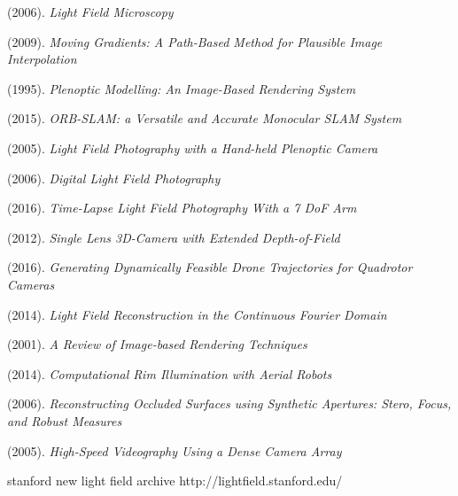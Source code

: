 \documentclass[12pt]{report}
\begin{document}
\begin{thebibliography}{10}
	(2006). \emph{Light Field Microscopy}
	
	(2009). \emph{Moving Gradients: A Path-Based Method for Plausible Image Interpolation}	
	
	(1995). \emph{Plenoptic Modelling: An Image-Based Rendering System}

	(2015). \emph{ORB-SLAM: a Versatile and Accurate Monocular SLAM System}

	(2005). \emph{Light Field Photography with a Hand-held Plenoptic Camera}

	(2006). \emph{Digital Light Field Photography}	

	(2016). \emph{Time-Lapse Light Field Photography With a 7 DoF Arm}

	(2012). \emph{Single Lens 3D-Camera with Extended Depth-of-Field}

	(2016). \emph{Generating Dynamically Feasible Drone Trajectories for Quadrotor Cameras}

	(2014). \emph{Light Field Reconstruction in the Continuous Fourier Domain}

	(2001). \emph{A Review of Image-based Rendering Techniques}

	(2014). \emph{Computational Rim Illumination with Aerial Robots}

	(2006). \emph{Reconstructing Occluded Surfaces using Synthetic Apertures: Stero, Focus, and Robust Measures} 
	
	(2005). \emph{High-Speed Videography Using a Dense Camera Array}

	stanford new light field archive http://lightfield.stanford.edu/

\end{thebibliography}
\end{document}
